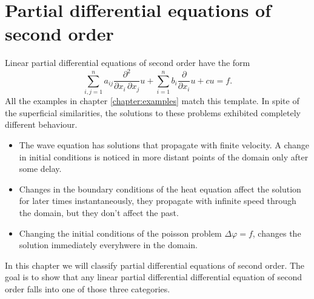 %
%
%
\chapter{Partial differential equations of second order\label{chapter-2ordnung}}
Linear partial differential equations of second order have the form
\begin{equation}
\sum_{i,j=1}^na_{ij}\frac{\partial^2}{\partial x_i\,\partial x_j} u
+
\sum_{i=1}^nb_i\frac{\partial}{\partial x_i} u+cu=f.
\label{operator2ordnung}
\end{equation}
All the examples in chapter
\ref{chapter:examples}
match this template.
In spite of the superficial similarities, the solutions to these problems
exhibited completely different behaviour.
\begin{itemize}
\item The wave equation has solutions that propagate with finite 
velocity.
A change in initial conditions is noticed in more distant points of
the domain only after some delay.
\item
Changes in the boundary conditions of the heat equation affect the solution
for later times instantaneously, they propagate with infinite speed through
the domain, but they don't affect the past.
\item
Changing the initial conditions of the poisson problem
$\Delta \varphi=f$,
changes the solution immediately everyhwere in the domain.
\end{itemize}
In this chapter we will classify partial differential equations of
second order.
The goal is to show that any linear partial differential differential
equation of second order falls into one of those three categories.






